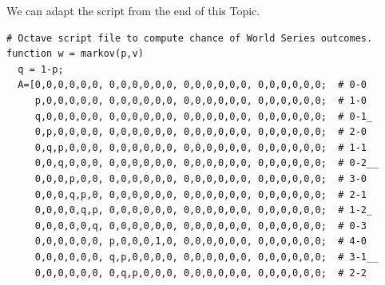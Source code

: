 \begin{exercises}
\begin{answer}
\begin{center}
     \end{center}
     \begin{exparts}
      \partsitem We can adapt the script from the end of this Topic.
\begin{lstlisting}
# Octave script file to compute chance of World Series outcomes.
function w = markov(p,v)
  q = 1-p;
  A=[0,0,0,0,0,0, 0,0,0,0,0,0, 0,0,0,0,0,0, 0,0,0,0,0,0;  # 0-0
     p,0,0,0,0,0, 0,0,0,0,0,0, 0,0,0,0,0,0, 0,0,0,0,0,0;  # 1-0
     q,0,0,0,0,0, 0,0,0,0,0,0, 0,0,0,0,0,0, 0,0,0,0,0,0;  # 0-1_
     0,p,0,0,0,0, 0,0,0,0,0,0, 0,0,0,0,0,0, 0,0,0,0,0,0;  # 2-0
     0,q,p,0,0,0, 0,0,0,0,0,0, 0,0,0,0,0,0, 0,0,0,0,0,0;  # 1-1
     0,0,q,0,0,0, 0,0,0,0,0,0, 0,0,0,0,0,0, 0,0,0,0,0,0;  # 0-2__
     0,0,0,p,0,0, 0,0,0,0,0,0, 0,0,0,0,0,0, 0,0,0,0,0,0;  # 3-0
     0,0,0,q,p,0, 0,0,0,0,0,0, 0,0,0,0,0,0, 0,0,0,0,0,0;  # 2-1
     0,0,0,0,q,p, 0,0,0,0,0,0, 0,0,0,0,0,0, 0,0,0,0,0,0;  # 1-2_
     0,0,0,0,0,q, 0,0,0,0,0,0, 0,0,0,0,0,0, 0,0,0,0,0,0;  # 0-3
     0,0,0,0,0,0, p,0,0,0,1,0, 0,0,0,0,0,0, 0,0,0,0,0,0;  # 4-0
     0,0,0,0,0,0, q,p,0,0,0,0, 0,0,0,0,0,0, 0,0,0,0,0,0;  # 3-1__
     0,0,0,0,0,0, 0,q,p,0,0,0, 0,0,0,0,0,0, 0,0,0,0,0,0;  # 2-2

\end{lstlisting}
\end{exparts}
\end{answer}
\end{exercises}
